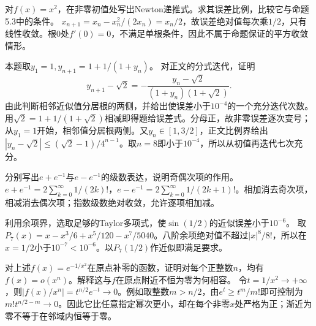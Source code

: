 对\(f(x)=x^2\)，在非零初值处写出Newton递推式。求其误差比例，比较它与命题5.3中的条件。
\solutionanswer
\(x_{n+1}=x_n-x_n^2/(2x_n)=x_n/2\)，故误差绝对值每次乘\(1/2\)，只有线性收敛。根\(0\)处\(f'(0)=0\)，不满足单根条件，因此不属于命题保证的平方收敛情形。


本题取\(y_1=1,y_{n+1}=1+1/(1+y_n)\)。
对正文的分式迭代，证明
\begin{equation*}
 y_{n+1}-\sqrt2=-\frac{y_n-\sqrt2}{(1+y_n)(1+\sqrt2)}.
\end{equation*}
由此判断相邻近似值分居根的两侧，并给出使误差小于\(10^{-4}\)的一个充分迭代次数。
\solutionanswer
用\(\sqrt2=1+1/(1+\sqrt2)\)相减即得题给误差式。分母正，故非零误差逐次变号；从\(y_1=1\)开始，相邻值分居根两侧。又\(y_n\in[1,3/2]\)，正文比例界给出\(|y_n-\sqrt2|\le(\sqrt2-1)/4^{n-1}\)。取\(n=8\)即小于\(10^{-4}\)，所以从初值再迭代七次充分。


分别写出\(e+e^{-1}\)与\(e-e^{-1}\)的级数表达，说明奇偶次项的作用。
\solutionanswer
\(e+e^{-1}=2\sum_{k=0}^\infty1/(2k)!\)，\(e-e^{-1}=2\sum_{k=0}^\infty1/(2k+1)!\)。相加消去奇次项，相减消去偶次项；指数级数绝对收敛，允许逐项相加减。


利用余项界，选取足够的Taylor多项式，使\(\sin(1/2)\)的近似误差小于\(10^{-6}\)。
\solutionanswer
取\(P_7(x)=x-x^3/6+x^5/120-x^7/5040\)。八阶余项绝对值不超过\(|x|^8/8!\)，所以在\(x=1/2\)小于\(10^{-7}<10^{-6}\)。以\(P_7(1/2)\)作近似即满足要求。


对上述\(f(x)=e^{-1/x^2}\)在原点补零的函数，证明对每个正整数\(n\)，均有\(f(x)=o(x^n)\)。解释这与\(f\)在原点附近不恒为零为何相容。
\solutionanswer
令\(t=1/x^2\to+\infty\)，则\(|f(x)/x^n|=t^{n/2}e^{-t}\to0\)。例如取整数\(m>n/2\)，由\(e^t\ge t^m/m!\)即可控制为\(m!t^{n/2-m}\to0\)。因此它比任意指定幂次更小，却在每个非零\(x\)处严格为正；渐近为零不等于在邻域内恒等于零。
\par
